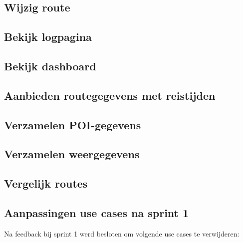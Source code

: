 \documentclass[a4paper]{article}
\begin{document}
\subsection{Wijzig route}
\newpage

\subsection{Bekijk logpagina}
\newpage

\subsection{Bekijk dashboard}
\newpage

\subsection{Aanbieden routegegevens met reistijden}
\newpage

\subsection{Verzamelen POI-gegevens}
\newpage

\subsection{Verzamelen weergegevens}
\newpage

\subsection{Vergelijk routes}
\newpage


\subsection{Aanpassingen use cases na sprint 1}
Na feedback bij sprint 1 werd besloten om volgende use cases te verwijderen:
\end{document}
